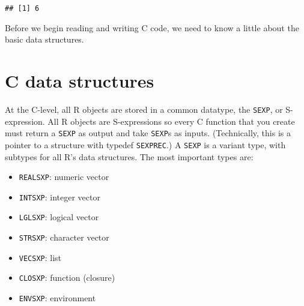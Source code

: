 \begin{Shaded}
\begin{Highlighting}[]
\StringTok{ }\NormalTok{(}\NormalTok{(} \NormalTok{, } \NormalTok{), }

\NormalTok{)}
\NormalTok{(}\NormalTok{, }\NormalTok{)}
\end{Highlighting}
\end{Shaded}

\begin{verbatim}
## [1] 6
\end{verbatim}

Before we begin reading and writing C code, we need to know a little
about the basic data structures.

\hypertarget{c-data-structures}{%
\section{C data structures}\label{c-data-structures}}

At the C-level, all R objects are stored in a common datatype, the
\texttt{SEXP}, or S-expression. All R objects are S-expressions so every
C function that you create must return a \texttt{SEXP} as output and
take \texttt{SEXP}s as inputs. (Technically, this is a pointer to a
structure with typedef \texttt{SEXPREC}.) A \texttt{SEXP} is a variant
type, with subtypes for all R's data structures. The most important
types are: 

\begin{itemize}
\tightlist
\item
  \texttt{REALSXP}: numeric vector
\item
  \texttt{INTSXP}: integer vector
\item
  \texttt{LGLSXP}: logical vector
\item
  \texttt{STRSXP}: character vector
\item
  \texttt{VECSXP}: list
\item
  \texttt{CLOSXP}: function (closure)
\item
  \texttt{ENVSXP}: environment
\end{itemize}

